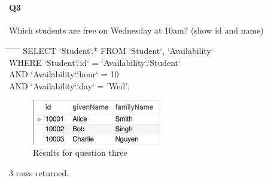 \documentclass[paper=a4, fontsize=11pt]{scrartcl} %
\numberwithin{equation}{section} %
\numberwithin{figure}{section} %
\numberwithin{table}{section} %
\begin{document}
    \section{ }
    \paragraph{Q3}Which students are free on Wednesday at 10am? (show id and name)
    \begin{center}
        \begin{minipage}{10cm}
        \begin{tabbing}
            \hspace*{.25in} \= \hspace*{.25in} \= \hspace*{.25in} \= \hspace*{.25in} \= \hspace*{.25in} \=\kill
            {\color{blue}SELECT `Student`.* FROM `Student`, `Availability`}\\
            \> {\color{blue}WHERE `Student`.`id` = `Availability`.`Student`} \\
            \> {\color{blue}AND `Availability`.`hour` = 10}\\
            \> {\color{blue} AND `Availability`.`day` = 'Wed';}
        
        \end{tabbing}
        \end{minipage}
    \end{center}
    \begin{figure}[htbp!]
        \centering
        \includegraphics[width=0.5\textwidth]{q31.png}
        \caption{Results for question three}%
        \vspace{-1em}
    \end{figure}

    {\color{red} 3 rows returned.}

    \section{ }
\end{document}

